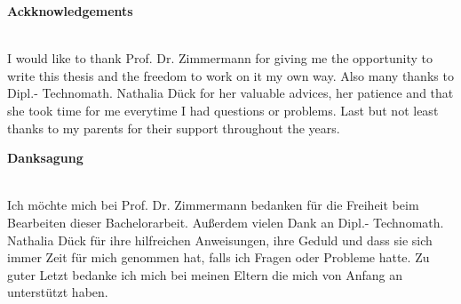 

\begin{center}
\large \textbf{Ackknowledgements} \\
~\\ %


\end{center}
I would like to thank Prof. Dr. Zimmermann for giving me the opportunity to write this thesis and the freedom to work on it my own way. Also many thanks to Dipl.- Technomath. Nathalia Dück for her valuable advices, her patience and that she took time for me everytime I had questions or problems. Last but not least thanks to my parents for their support throughout the years. 

\vfill %
\begin{center}
\large \textbf{Danksagung} \\
~\\ %
\end{center}
Ich möchte mich bei Prof. Dr. Zimmermann bedanken für die Freiheit beim Bearbeiten dieser Bachelorarbeit. Außerdem vielen Dank an Dipl.- Technomath. Nathalia Dück für ihre hilfreichen Anweisungen, ihre Geduld und dass sie sich immer Zeit für mich genommen hat, falls ich Fragen oder Probleme hatte. Zu guter Letzt bedanke ich mich bei meinen Eltern die mich von Anfang an unterstützt haben.